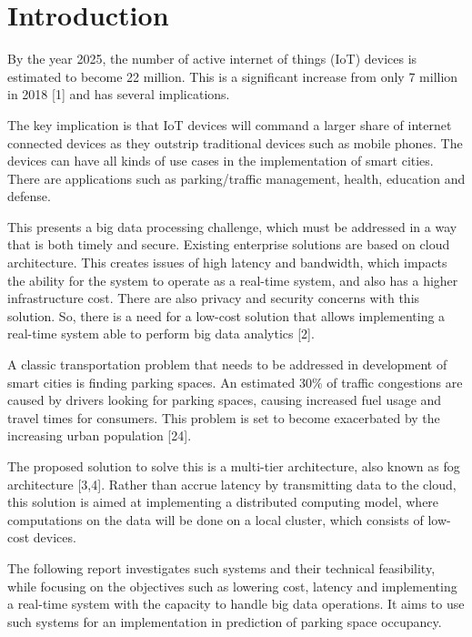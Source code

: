 
\section{Introduction}
By the year 2025, the number of active internet of things (IoT) devices is estimated to become 22 million. This is a significant increase from only 7 million in 2018 [1] and has several implications.   

 

The key implication is that IoT devices will command a larger share of internet connected devices as they outstrip traditional devices such as mobile phones. The devices can have all kinds of use cases in the implementation of smart cities. There are applications such as parking/traffic management, health, education and defense.  

 

This presents a big data processing challenge, which must be addressed in a way that is both timely and secure. Existing enterprise solutions are based on cloud architecture. This creates issues of high latency and bandwidth, which impacts the ability for the system to operate as a real-time system, and also has a higher infrastructure cost. There are also privacy and security concerns with this solution. So, there is a need for a low-cost solution that allows implementing a real-time system able to perform big data analytics [2].  

 

A classic transportation problem that needs to be addressed in development of smart cities is finding parking spaces. An estimated 30\% of traffic congestions are caused by drivers looking for parking spaces, causing increased fuel usage and  travel times for consumers. This problem is set to become exacerbated by the increasing urban population [24].  

 

The proposed solution to solve this is a multi-tier architecture, also known as fog architecture [3,4]. Rather than accrue latency by transmitting data to the cloud, this solution is aimed at implementing a distributed computing model, where computations on the data will be done on a local cluster, which consists of low-cost devices.   

 

The following report investigates such systems and their technical feasibility, while focusing on the objectives such as lowering cost, latency and implementing a real-time system with the capacity to handle big data operations. It aims to use such systems for an implementation in prediction of parking space occupancy.  


